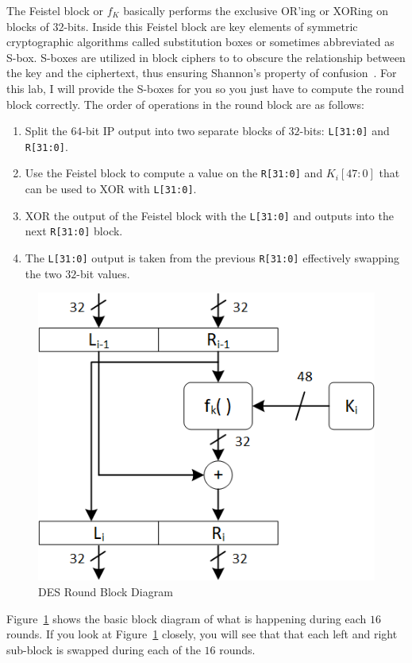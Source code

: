 \documentclass{article}
\begin{document}
The Feistel block or $f_K$ basically performs the exclusive OR'ing or
XORing on blocks of $32$-bits.  Inside this Feistel block are key
elements of
symmetric cryptographic algorithms called substitution boxes or
sometimes abbreviated as S-box.  S-boxes are utilized in block ciphers to
to obscure the relationship between the key and the ciphertext, thus
ensuring Shannon's property of confusion~\cite{10.5555/1721909}.   For
this lab, I will provide the S-boxes for you so you just have to
compute the round block correctly.  The order of operations in the
round block are as follows:
\begin{enumerate}
\item Split the $64$-bit IP output into two separate blocks of $32$-bits:
  \verb!L[31:0]! and \verb!R[31:0]!.
\item Use the Feistel block to compute a value on the \verb!R[31:0]!
  and $K_i[47:0]$
  that can be used to XOR with \verb!L[31:0]!.  
\item XOR the output of the Feistel block with the \verb!L[31:0]! and
  outputs into the next \verb!R[31:0]! block.
\item The \verb!L[31:0]! output is taken from the previous
  \verb!R[31:0]! effectively swapping the two $32$-bit values.
\end{enumerate}
\begin{figure} [t!]
  \centering
  \includegraphics[scale=1.0]{des-round.png}
  \caption{DES Round Block Diagram}
  \label{des-round.png}
\end{figure}
Figure~\ref{des-round.png} shows the basic block diagram of what is
happening during each $16$ rounds.  If you look at
Figure~\ref{des-round.png} closely, you will see that that each left
and right sub-block is swapped during each of the $16$ rounds.
\end{document}
